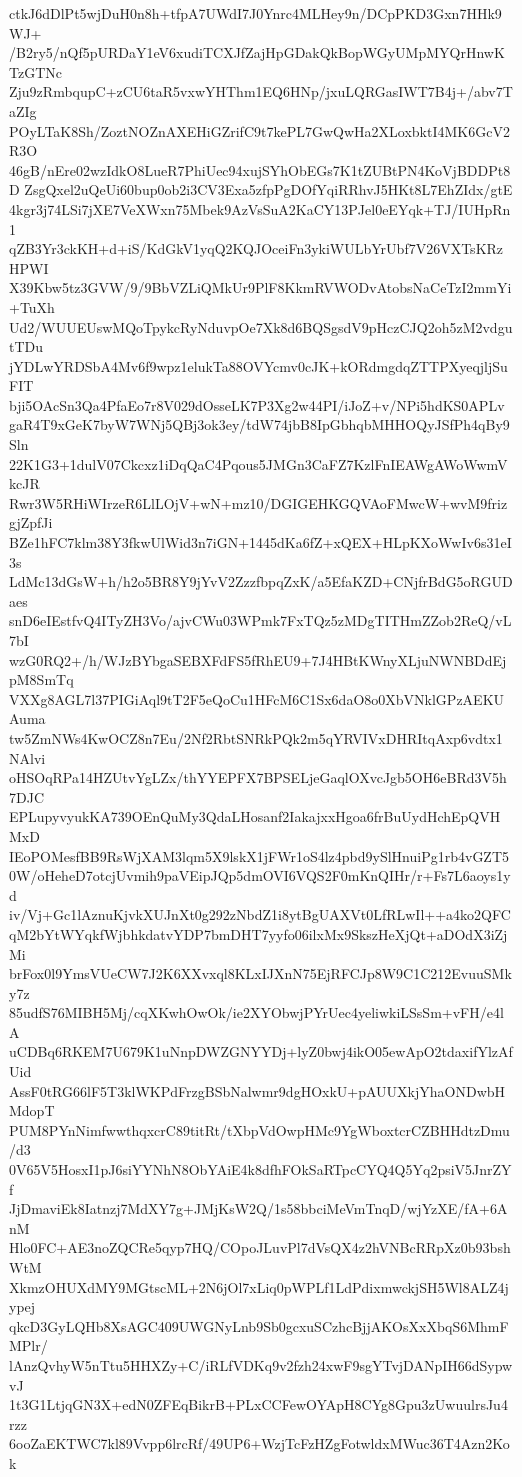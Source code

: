 ctkJ6dDlPt5wjDuH0n8h+tfpA7UWdI7J0Ynrc4MLHey9n/DCpPKD3Gxn7HHk9WJ+
/B2ry5/nQf5pURDaY1eV6xudiTCXJfZajHpGDakQkBopWGyUMpMYQrHnwKTzGTNc
Zju9zRmbqupC+zCU6taR5vxwYHThm1EQ6HNp/jxuLQRGasIWT7B4j+/abv7TaZIg
POyLTaK8Sh/ZoztNOZnAXEHiGZrifC9t7kePL7GwQwHa2XLoxbktI4MK6GcV2R3O
46gB/nEre02wzIdkO8LueR7PhiUec94xujSYhObEGs7K1tZUBtPN4KoVjBDDPt8D
ZsgQxel2uQeUi60bup0ob2i3CV3Exa5zfpPgDOfYqiRRhvJ5HKt8L7EhZIdx/gtE
4kgr3j74LSi7jXE7VeXWxn75Mbek9AzVsSuA2KaCY13PJel0eEYqk+TJ/IUHpRn1
qZB3Yr3ckKH+d+iS/KdGkV1yqQ2KQJOceiFn3ykiWULbYrUbf7V26VXTsKRzHPWI
X39Kbw5tz3GVW/9/9BbVZLiQMkUr9PlF8KkmRVWODvAtobsNaCeTzI2mmYi+TuXh
Ud2/WUUEUswMQoTpykcRyNduvpOe7Xk8d6BQSgsdV9pHczCJQ2oh5zM2vdgutTDu
jYDLwYRDSbA4Mv6f9wpz1elukTa88OVYcmv0cJK+kORdmgdqZTTPXyeqjljSuFIT
bji5OAcSn3Qa4PfaEo7r8V029dOsseLK7P3Xg2w44PI/iJoZ+v/NPi5hdKS0APLv
gaR4T9xGeK7byW7WNj5QBj3ok3ey/tdW74jbB8IpGbhqbMHHOQyJSfPh4qBy9Sln
22K1G3+1dulV07Ckcxz1iDqQaC4Pqous5JMGn3CaFZ7KzlFnIEAWgAWoWwmVkcJR
Rwr3W5RHiWIrzeR6LlLOjV+wN+mz10/DGIGEHKGQVAoFMwcW+wvM9frizgjZpfJi
BZe1hFC7klm38Y3fkwUlWid3n7iGN+1445dKa6fZ+xQEX+HLpKXoWwIv6s31eI3s
LdMc13dGsW+h/h2o5BR8Y9jYvV2ZzzfbpqZxK/a5EfaKZD+CNjfrBdG5oRGUDaes
snD6eIEstfvQ4ITyZH3Vo/ajvCWu03WPmk7FxTQz5zMDgTITHmZZob2ReQ/vL7bI
wzG0RQ2+/h/WJzBYbgaSEBXFdFS5fRhEU9+7J4HBtKWnyXLjuNWNBDdEjpM8SmTq
VXXg8AGL7l37PIGiAql9tT2F5eQoCu1HFcM6C1Sx6daO8o0XbVNklGPzAEKUAuma
tw5ZmNWs4KwOCZ8n7Eu/2Nf2RbtSNRkPQk2m5qYRVIVxDHRItqAxp6vdtx1NAlvi
oHSOqRPa14HZUtvYgLZx/thYYEPFX7BPSELjeGaqlOXvcJgb5OH6eBRd3V5h7DJC
EPLupyvyukKA739OEnQuMy3QdaLHosanf2IakajxxHgoa6frBuUydHchEpQVHMxD
IEoPOMesfBB9RsWjXAM3lqm5X9lskX1jFWr1oS4lz4pbd9ySlHnuiPg1rb4vGZT5
0W/oHeheD7otcjUvmih9paVEipJQp5dmOVI6VQS2F0mKnQIHr/r+Fs7L6aoys1yd
iv/Vj+Gc1lAznuKjvkXUJnXt0g292zNbdZ1i8ytBgUAXVt0LfRLwIl++a4ko2QFC
qM2bYtWYqkfWjbhkdatvYDP7bmDHT7yyfo06ilxMx9SkszHeXjQt+aDOdX3iZjMi
brFox0l9YmsVUeCW7J2K6XXvxql8KLxIJXnN75EjRFCJp8W9C1C212EvuuSMky7z
85udfS76MIBH5Mj/cqXKwhOwOk/ie2XYObwjPYrUec4yeliwkiLSsSm+vFH/e4lA
uCDBq6RKEM7U679K1uNnpDWZGNYYDj+lyZ0bwj4ikO05ewApO2tdaxifYlzAfUid
AssF0tRG66lF5T3klWKPdFrzgBSbNalwmr9dgHOxkU+pAUUXkjYhaONDwbHMdopT
PUM8PYnNimfwwthqxcrC89titRt/tXbpVdOwpHMc9YgWboxtcrCZBHHdtzDmu/d3
0V65V5HosxI1pJ6siYYNhN8ObYAiE4k8dfhFOkSaRTpcCYQ4Q5Yq2psiV5JnrZYf
JjDmaviEk8Iatnzj7MdXY7g+JMjKsW2Q/1s58bbciMeVmTnqD/wjYzXE/fA+6AnM
Hlo0FC+AE3noZQCRe5qyp7HQ/COpoJLuvPl7dVsQX4z2hVNBcRRpXz0b93bshWtM
XkmzOHUXdMY9MGtscML+2N6jOl7xLiq0pWPLf1LdPdixmwckjSH5Wl8ALZ4jypej
qkcD3GyLQHb8XsAGC409UWGNyLnb9Sb0gcxuSCzhcBjjAKOsXxXbqS6MhmFMPlr/
lAnzQvhyW5nTtu5HHXZy+C/iRLfVDKq9v2fzh24xwF9sgYTvjDANpIH66dSypwvJ
1t3G1LtjqGN3X+edN0ZFEqBikrB+PLxCCFewOYApH8CYg8Gpu3zUwuulrsJu4rzz
6ooZaEKTWC7kl89Vvpp6lrcRf/49UP6+WzjTcFzHZgFotwldxMWuc36T4Azn2Kok
